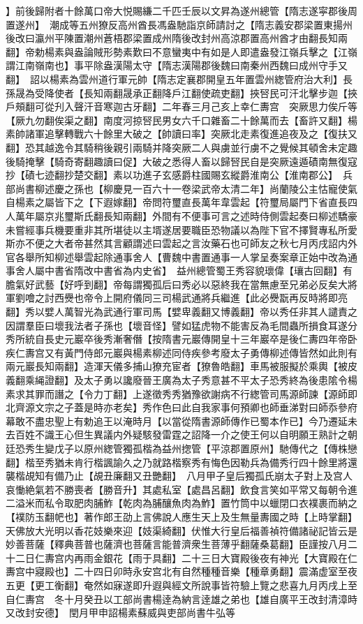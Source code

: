 】前後歸附者十餘萬口帝大悦賜縑二千匹壬辰以文昇為遂州總管【隋志遂寜郡後周置遂州】　潮成等五州獠反高州酋長馮盎馳詣京師請討之【隋志義安郡梁置東揚州後改曰瀛州平陳置潮州蒼梧郡梁置成州隋後改封州高涼郡置高州酋才由翻長知兩翻】帝勅楊素與盎論賊形勢素歎曰不意蠻夷中有如是人即遣盎發江嶺兵擊之【江嶺謂江南嶺南也】事平除盎漢陽太守【隋志漢陽郡後魏曰南秦州西魏曰成州守手又翻】　詔以楊素為雲州道行軍元帥【隋志定襄郡開皇五年置雲州緫管府治大利】長孫晟為受降使者【長知兩翻晟承正翻降戶江翻使疏吏翻】挾唘民可汗北擊步迦【挾戶頰翻可從刋入聲汗音寒迦古牙翻】二年春三月己亥上幸仁夀宫　突厥思力俟斤等【厥九勿翻俟渠之翻】南度河掠唘民男女六千口雜畜二十餘萬而去【畜許又翻】楊素帥諸軍追擊轉戰六十餘里大破之【帥讀曰率】突厥北走素復進追夜及之【復扶又翻】恐其越逸令其騎稍後親引兩騎并降突厥二人與虜並行虜不之覺候其頓舍未定趣後騎掩擊【騎奇寄翻趣讀曰促】大破之悉得人畜以歸唘民自是突厥遠遁磧南無復寇抄【磧七迹翻抄楚交翻】素以功進子玄感爵柱國賜玄縱爵淮南公【淮南郡公】　兵部尚書柳述慶之孫也【柳慶見一百六十一卷梁武帝太清二年】尚蘭陵公主怙寵使氣自楊素之屬皆下之【下遐嫁翻】帝問符璽直長萬年韋雲起【符璽局屬門下省直長四人萬年屬京兆璽斯氏翻長知兩翻】外間有不便事可言之述時侍側雲起奏曰柳述驕豪未嘗經事兵機要重非其所堪徒以主壻遂居要職臣恐物議以為陛下官不擇賢專私所愛斯亦不便之大者帝甚然其言顧謂述曰雲起之言汝藥石也可師友之秋七月丙戌詔内外官各舉所知柳述舉雲起除通事舍人【曹魏中書置通事一人掌呈奏案章正始中改為通事舍人屬中書省隋改中書省為内史省】　益州總管蜀王秀容貌瓌偉【瓖古回翻】有膽氣好武藝【好呼到翻】帝每謂獨孤后曰秀必以惡終我在當無慮至兄弟必反矣大將軍劉噲之討西㸑也帝令上開府儀同三司楊武通將兵繼進【此必㸑翫再反時將即亮翻】秀以嬖人萬智光為武通行軍司馬【嬖卑義翻又博義翻】帝以秀任非其人譴責之因謂羣臣曰壞我法者子孫也【壞音怪】譬如猛虎物不能害反為毛間蟲所損食耳遂分秀所統自長史元巖卒後秀漸奢僭【按隋書元巖傳開皇十三年巖卒是後仁夀四年帝卧疾仁夀宫又有黃門侍郎元巖與楊素柳述同侍疾參考廢太子勇傳柳述傳皆然如此則有兩元巖長知兩翻】造渾天儀多捕山獠充宦者【獠魯皓翻】車馬被服擬於乘輿【被皮義翻乘䋲證翻】及太子勇以讒廢晉王廣為太子秀意甚不平太子恐秀終為後患隂令楊素求其罪而譖之【令力丁翻】上遂徵秀秀猶豫欲謝病不行緫管司馬源師諫【源師即北齊源文宗之子蓋是時亦老矣】秀作色曰此自我家事何預卿也師垂涕對曰師忝參府幕敢不盡忠聖上有勅追王以淹時月【以當從隋書源師傳作已蜀本作已】今乃遷延未去百姓不識王心但生異議内外疑駭發雷霆之詔降一介之使王何以自明願王熟計之朝廷恐秀生變戊子以原州緫管獨孤楷為益州揔管【平涼郡置原州】馳傳代之【傳株戀翻】楷至秀猶未肯行楷諷諭久之乃就路楷察秀有悔色因勒兵為備秀行四十餘里將還襲楷覘知有備乃止【覘丑廉翻又丑艷翻】　八月甲子皇后獨孤氏崩太子對上及宫人哀慟絶氣若不勝喪者【勝音升】其處私室【處昌呂翻】飲食言笑如平常又每朝令進二溢米而私令取肥肉脯鮓【乾肉為脯釀魚肉為鮓】置竹筒中以蠟閉口衣襆裹而納之【襆防玉翻帊也】著作郎王劭上言佛說人應生天上及生無量夀國之時【上時掌翻】天佛放大光明以香花妓樂來迎【妓渠綺翻】伏惟大行皇后福善禎符備諸祕記皆云是妙善菩薩【釋典菩普也薩濟也菩薩言能普濟衆生菩薄乎翻薩桑葛翻】臣謹按八月二十二日仁夀宫内再雨金銀花【雨于具翻】二十三日大寶殿後夜有神光【大寶殿在仁夀宫中寢殿也】二十四日卯時永安宫北有自然種種音樂【種章勇翻】震滿虚室至夜五更【更工衡翻】奄然如寐遂即升遐與經文所說事皆符驗上覽之悲喜九月丙戌上至自仁夀宫　冬十月癸丑以工部尚書楊逹為納言逹雄之弟也【雄自廣平王改封清漳時又改封安德】　閏月甲申詔楊素蘇威與吏部尚書牛弘等